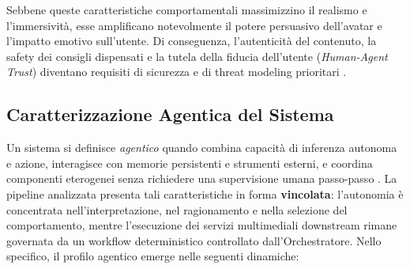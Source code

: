 \documentclass[11pt,a4paper]{article}
\begin{document}
Sebbene queste caratteristiche comportamentali massimizzino il realismo e l'immersività, esse amplificano notevolmente il potere persuasivo dell'avatar e l'impatto emotivo sull'utente. Di conseguenza, l'autenticità del contenuto, la safety dei consigli dispensati e la tutela della fiducia dell'utente (\emph{Human-Agent Trust}) diventano requisiti di sicurezza e di threat modeling prioritari \cite{persona,verbalhabits}.

\subsection{Caratterizzazione Agentica del Sistema}
\label{subsec:caratterizzazione-agentica}

Un sistema si definisce \emph{agentico} quando combina capacità di inferenza autonoma e azione, interagisce con memorie persistenti e strumenti esterni, e coordina componenti eterogenei senza richiedere una supervisione umana passo-passo \cite{damianiagentic}. 
La pipeline analizzata presenta tali caratteristiche in forma \textbf{vincolata}: l'autonomia è concentrata nell'interpretazione, nel ragionamento e nella selezione del comportamento, mentre l'esecuzione dei servizi multimediali downstream rimane governata da un workflow deterministico controllato dall'Orchestratore. Nello specifico, il profilo agentico emerge nelle seguenti dinamiche:
\end{document}
